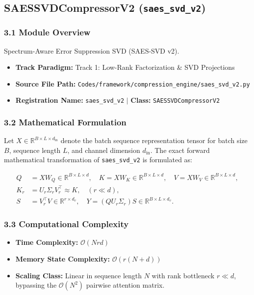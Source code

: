 \subsection{SAESSVDCompressorV2 (\texttt{saes\_svd\_v2})}
\label{sec:app_module_saes_svd_v2}

\subsubsection*{3.1 Module Overview}
Spectrum-Aware Error Suppression SVD (SAES-SVD v2).
\begin{itemize}
    \item \textbf{Track Paradigm:} Track 1: Low-Rank Factorization & SVD Projections
    \item \textbf{Source File Path:} \texttt{Codes/framework/compression\_engine/saes\_svd\_v2.py}
    \item \textbf{Registration Name:} \texttt{saes\_svd\_v2} $\mid$ \textbf{Class:} \texttt{SAESSVDCompressorV2}
\end{itemize}

\subsubsection*{3.2 Mathematical Formulation}
Let $X \in \mathbb{R}^{B \times L \times d_{\text{in}}}$ denote the batch sequence representation tensor for batch size $B$, sequence length $L$, and channel dimension $d_{\text{in}}$. The exact forward mathematical transformation of \texttt{saes\_svd\_v2} is formulated as:

\begin{align}
Q &= X W_Q \in \mathbb{R}^{B \times L \times d}, \quad K = X W_K \in \mathbb{R}^{B \times L \times d}, \quad V = X W_V \in \mathbb{R}^{B \times L \times d}, \\
K_r &= U_r \Sigma_r V_r^\top \approx K, \quad (r \ll d), \\
S &= V_r^\top V \in \mathbb{R}^{r \times d_v}, \quad Y = (Q U_r \Sigma_r) S \in \mathbb{R}^{B \times L \times d_v}.
\end{align}


\subsubsection*{3.3 Computational Complexity}
\begin{itemize}
    \item \textbf{Time Complexity:} $\mathcal{O}(N r d)$
    \item \textbf{Memory State Complexity:} $\mathcal{O}(r(N + d))$
    \item \textbf{Scaling Class:} Linear in sequence length $N$ with rank bottleneck $r \ll d$, bypassing the $\mathcal{O}(N^2)$ pairwise attention matrix.
\end{itemize}

